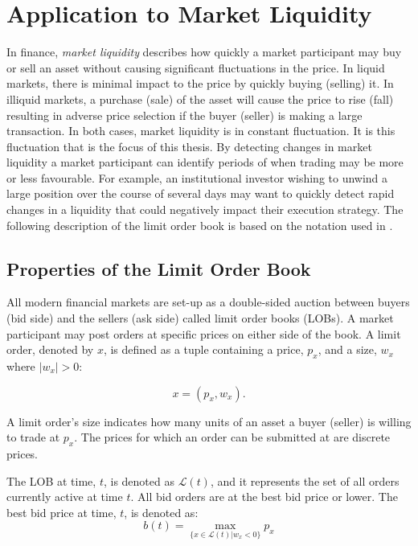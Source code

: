 \chapter{Application to Market Liquidity}

In finance, \textit{market liquidity} describes how quickly a market participant may buy or sell an asset without causing significant fluctuations in the price. In liquid markets, there is minimal impact to the price by quickly buying (selling) it. In illiquid markets, a purchase (sale) of the asset will cause the price to rise (fall) resulting in adverse price selection if the buyer (seller) is making a large transaction. In both cases, market liquidity is in constant fluctuation. It is this fluctuation that is the focus of this thesis. 
By detecting changes in market liquidity a market participant can identify periods of when trading may be more or less favourable. For example, an institutional investor wishing to unwind a large position over the course of several days may want to quickly detect rapid changes in a liquidity that could negatively impact their execution strategy. The following description of the limit order book is based on the notation used in \cite{gould2016queue}. 

\section{Properties of the Limit Order Book}
All modern financial markets are set-up as a double-sided auction between buyers (bid side) and the sellers (ask side) called limit order books (LOBs). A market participant may post orders at specific prices on either side of the book. A limit order, denoted by $x$, is defined as a tuple containing a price, $p_x$, and a size, $w_x$ where $|w_x|>0$:

\begin{equation}
x = (p_x, w_x).
\end{equation}

A limit order's size indicates how many units of an asset a buyer (seller) is willing to trade at $p_x$. The prices for which an order can be submitted at are discrete prices. 

The LOB at time, $t$, is denoted as $\mathcal{L}(t)$, and it represents the set of all orders currently active at time $t$. All bid orders are at the best bid price or lower. The best bid price at time, $t$,  is denoted as:
\begin{equation}
b(t) =  \max_{\{x \in \mathcal{L}(t)|w_x<0 \}} p_x
\end{equation}

